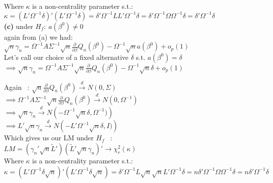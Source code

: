 \documentclass[11pt]{article}
\theoremstyle{definition}
\newcommand*\circled[1]{\tikz[baseline=(char.base)]{
            \node[shape=circle,draw,inner sep=2pt] (char) {#1};}}
\def\indist{\stackrel{d}{\rightarrow}}
\begin{document}
Where $\kappa$ is a non-centrality parameter s.t.: \\

$\kappa = \left(L'\Omega^{-1}\delta\right)'\left(L'\Omega^{-1}\delta\right)=\delta'\Omega^{-1} LL' \Omega^{-1}\delta=\delta'\Omega^{-1} \Omega \Omega^{-1}\delta=\delta'\Omega^{-1}\delta$ \\

\noindent
\textbf{(c)} under $H_{f}: \ a(\beta^{0})\neq 0$ \\

again from (a) we had: \\

$\sqrt{n}\gamma_{n}=\Omega^{-1}A\Sigma^{-1}\sqrt{n}\frac{\partial}{\partial \beta} Q_{n}(\beta^{0})-\Omega^{-1}\sqrt{n}a(\beta^{0})+o_{p}(1)$\\

Let's call our choice of a fixed alternative $\delta$ s.t.  $a(\beta^{0})= \delta$ \\

$\implies \sqrt{n}\gamma_{n}=\Omega^{-1}A\Sigma^{-1}\sqrt{n}\frac{\partial}{\partial \beta} Q_{n}(\beta^{0})-\Omega^{-1}\sqrt{n}\delta+o_{p}(1)$

Again \circled{B} \ : $ \sqrt{n}\frac{\partial}{\partial \beta}Q_{n}(\beta^{0}) \indist N(0,\Sigma)$ \\

$\implies \Omega^{-1}A\Sigma^{-1}\sqrt{n}\frac{\partial}{\partial \beta} Q_{n}(\beta^{0}) \indist N\left(0,\Omega^{-1}\right)$ \\

$\implies \sqrt{n}\gamma_{n} \indist N\left(-\Omega^{-1}\sqrt{n}\delta,\Omega^{-1})\right)$ \\

$\implies L'\sqrt{n}\gamma_{n} \indist N\left(-L'\Omega^{-1}\sqrt{n}\delta, I)\right)$ \\

Which gives us our LM under $H_{f}$ \ : \\

$LM=\left(\gamma_{n}'\sqrt{n}\tilde{L}'\right)\left(\tilde{L}'\sqrt{n}\gamma_{n}\right)' \rightarrow \chi_{r}^{2}(\kappa)$ \\

Where $\kappa$ is a non-centrality parameter s.t.: \\

$\kappa = \left(L'\Omega^{-1}\delta\sqrt{n}\right)'\left(L'\Omega^{-1}\delta\sqrt{n}\right)=\delta'\Omega^{-1} L\sqrt{n}\sqrt{n}L' \Omega^{-1}\delta=n\delta'\Omega^{-1} \Omega \Omega^{-1}\delta=n\delta'\Omega^{-1}\delta$ \\
\end{document}
